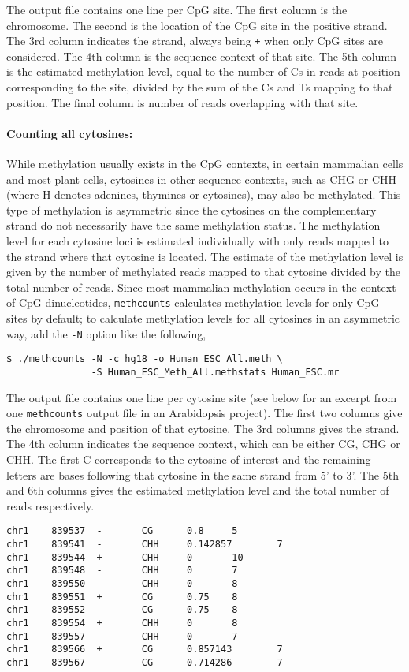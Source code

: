 \documentclass[10pt]{article}
\newcommand{\prog}[1]{\texttt{#1}}
\newcommand{\lit}[1]{\texttt{#1}}
\newcommand{\op}[1]{\texttt{#1}}
\begin{document}
The output file contains one line per CpG site. The first column is
the chromosome. The second is the location of the CpG site in the
positive strand. The 3rd column indicates the strand, always being
\lit{+} when only CpG sites are considered. The 4th column is the
sequence context of that site. The 5th column is the estimated
methylation level, equal to the number of Cs in reads at position
corresponding to the site, divided by the sum of the Cs and Ts mapping
to that position. The final column is number of reads overlapping with
that site.

\paragraph{Counting all cytosines:}
While methylation usually exists in the CpG contexts, in certain
mammalian cells and most plant cells, cytosines in other sequence
contexts, such as CHG or CHH (where H denotes adenines, thymines or
cytosines), may also be methylated. This type of methylation is
asymmetric since the cytosines on the complementary strand do not
necessarily have the same methylation status. The methylation level
for each cytosine loci is estimated individually with only reads
mapped to the strand where that cytosine is located. The estimate of
the methylation level is given by the number of methylated reads
mapped to that cytosine divided by the total number of reads. Since
most mammalian methylation occurs in the context of CpG dinucleotides,
\prog{methcounts} calculates methylation levels for only CpG sites by
default; to calculate methylation levels for all cytosines in an
asymmetric way, add the \op{-N} option like the following,
\begin{verbatim}
$ ./methcounts -N -c hg18 -o Human_ESC_All.meth \
               -S Human_ESC_Meth_All.methstats Human_ESC.mr
\end{verbatim}

The output file contains one line per cytosine site (see below for an
excerpt from one \prog{methcounts} output file in an Arabidopsis
project). The first two columns give the chromosome and position of
that cytosine. The 3rd columns gives the strand. The 4th column
indicates the sequence context, which can be either CG, CHG or CHH.
The first C corresponds to the cytosine of interest and the
remaining letters are bases following that cytosine in the same
strand from 5' to 3'. The 5th and 6th columns gives the estimated
methylation level and the total number of reads respectively.
{\small{%
\begin{verbatim}
chr1    839537  -       CG      0.8     5
chr1    839541  -       CHH     0.142857        7
chr1    839544  +       CHH     0       10
chr1    839548  -       CHH     0       7
chr1    839550  -       CHH     0       8
chr1    839551  +       CG      0.75    8
chr1    839552  -       CG      0.75    8
chr1    839554  +       CHH     0       8
chr1    839557  -       CHH     0       7
chr1    839566  +       CG      0.857143        7
chr1    839567  -       CG      0.714286        7
\end{verbatim}%
}}
\end{document}
